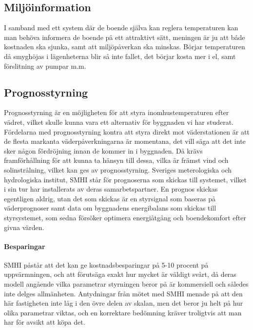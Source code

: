 \subsection{Miljöinformation}
I samband med ett system där de boende själva kan reglera temperaturen kan man behöva informera de boende på ett attraktivt sätt, meningen är ju att både kostnaden ska sjunka, samt att miljöpåverkan ska minskas. Börjar temperaturen då smyghöjas i lägenheterna blir så inte fallet, det börjar kosta mer i el, samt förslitning av pumpar m.m.  \cite{viivilla}


\subsection{Prognosstyrning}
Prognosstyrning är en möjligheten för att styra inomhustemperaturen efter vädret, vilket skulle kunna vara ett alternativ för byggnaden vi har studerat.
Fördelarna med prognosstyrning kontra att styra direkt mot väderstationen är att de flesta markanta väderpåverkningarna är momentana, det vill säga att det inte sker någon fördröjning innan de kommer in i byggnaden. Då krävs framförhållning för att kunna ta hänsyn till dessa, vilka är främst vind och solinstrålning, vilket kan ges av prognosstyrning. Sveriges meterologiska och hydrologiska institut, SMHI står för prognoserna som skickas till systemet, vilket i sin tur har installerats av deras samarbetspartner. En prognos skickas egentligen aldrig, utan det som skickas är en styrsignal som baseras på väderprognoser samt data om byggnadens energibalans som skickas till styrsystemet, som sedna försöker optimera energiåtgång och boendekomfort efter givna värden.

\paragraph{Besparingar}
SMHI påstår att det kan ge kostnadsbesparingar på 5-10 procent på uppvärmningen, och att förutsäga exakt hur mycket är väldigt svårt, då deras modell angående vilka parametrar styrningen beror på är kommersiell och således inte delges allmänheten. Antydningar från mötet med SMHI menade på att den här fastigheten inte låg i den övre delen av skalan, men det beror ju helt på hur olika parametrar viktas, och en korrektare bedömning kräver troligtvis att man har för avsikt att köpa det.

